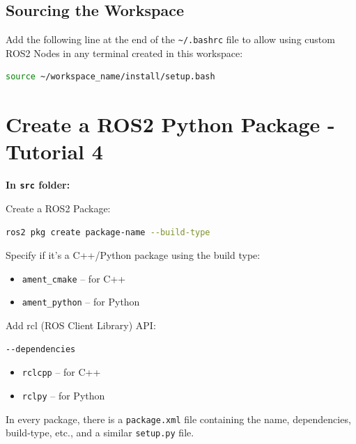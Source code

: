 \documentclass{article}
\newcommand{\code}[1]{\colorbox{codeBg}{\texttt{#1}}}
\begin{document}
\subsection*{Sourcing the Workspace}

Add the following line at the end of the \code{\textasciitilde/.bashrc} file to allow using custom ROS2 Nodes in any terminal created in this workspace:
\begin{lstlisting}[style=bashStyle, language=bash]
source ~/workspace_name/install/setup.bash
\end{lstlisting}

\newpage

\section{Create a ROS2 Python Package - Tutorial 4}

\vspace{0.3cm}
\noindent \textbf{In \code{src} folder:}

\vspace{0.1cm}
\noindent Create a ROS2 Package:
\begin{lstlisting}[style=bashStyle, language=bash]
ros2 pkg create package-name --build-type
\end{lstlisting}
\noindent Specify if it's a C++/Python package using the build type:
\begin{itemize}
    \item \code{ament\_cmake} -- for C++
    \item \code{ament\_python} -- for Python
\end{itemize}

\vspace{0.3cm}
\noindent Add rcl (ROS Client Library) API:
\begin{lstlisting}[style=bashStyle, language=bash]
--dependencies
\end{lstlisting}
\begin{itemize}
    \item \code{rclcpp} -- for C++
    \item \code{rclpy} -- for Python
\end{itemize}

\vspace{0.3cm}
\begin{notebox}
In every package, there is a \code{package.xml} file containing the name, dependencies, build-type, etc., and a similar \code{setup.py} file.
\end{notebox}
\end{document}
